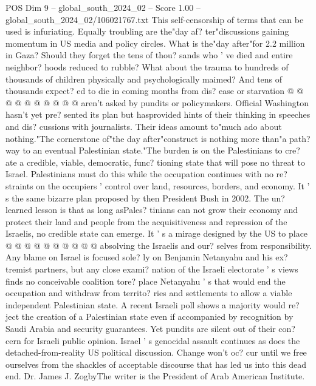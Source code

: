 \begin{textsample}{POS Dim 9 – global\_south\_2024\_02 – Score 1.00 – global\_south\_2024\_02/106021767.txt}
This self-censorship of terms that can be used is infuriating.
Equally troubling are the"day af? ter"discussions gaining momentum in US media and policy circles.
What is the"day after"for 2.2 million in Gaza?
Should they forget the tens of thou? sands who ' ve died and entire neighbor? hoods reduced to rubble?
What about the trauma to hundreds of thousands of children physically and psychologically maimed?
And tens of thousands expect? ed to die in coming months from dis? ease or starvation @ @ @ @ @ @ @ @ @ @ aren't asked by pundits or policymakers.
Official Washington hasn't yet pre? sented its plan but hasprovided hints of their thinking in speeches and dis? cussions with journalists.
Their ideas amount to"much ado about nothing."The cornerstone of"the day after"construct is nothing more than"a path? way to an eventual Palestinian state."The burden is on the Palestinians to cre? ate a credible, viable, democratic, func? tioning state that will pose no threat to Israel.
Palestinians must do this while the occupation continues with no re? straints on the occupiers ' control over land, resources, borders, and economy.
It ' s the same bizarre plan proposed by then President Bush in 2002.
The un? learned lesson is that as long asPales? tinians can not grow their economy and protect their land and people from the acquisitiveness and repression of the Israelis, no credible state can emerge.
It ' s a mirage designed by the US to place @ @ @ @ @ @ @ @ @ @ absolving the Israelis and our? selves from responsibility.
Any blame on Israel is focused sole? ly on Benjamin Netanyahu and his ex? tremist partners, but any close exami? nation of the Israeli electorate ' s views finds no conceivable coalition tore? place Netanyahu ' s that would end the occupation and withdraw from territo? ries and settlements to allow a viable independent Palestinian state.
A recent Israeli poll shows a majority would re? ject the creation of a Palestinian state even if accompanied by recognition by Saudi Arabia and security guarantees.
Yet pundits are silent out of their con? cern for Israeli public opinion.
Israel ' s genocidal assault continues as does the detached-from-reality US political discussion.
Change won't oc? cur until we free ourselves from the shackles of acceptable discourse that has led us into this dead end.
Dr.
James J.
ZogbyThe writer is the President of Arab American Institute.

\end{textsample}
